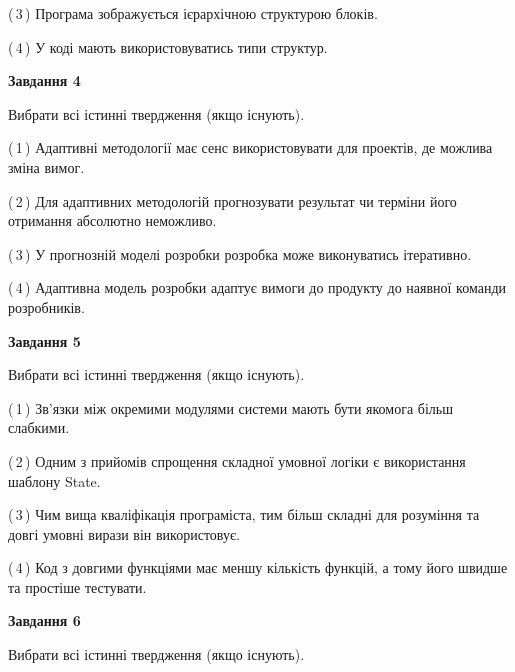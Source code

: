 \documentclass[10pt, ukrainian]{article}
\begin{document}
{\begin {large}
(\,3\,) Програма зображується ієрархічною структурою блоків.%



(\,4\,) У коді мають використовуватись типи структур. %


{\begin {center}\textbf{Завдання 4}\end {center}}\par
Вибрати всі істинні твердження (якщо існують).\par
\vspace{2mm}



(\,1\,) Адаптивні методології має сенс використовувати для проектів, де можлива зміна вимог. %



(\,2\,) Для адаптивних методологій прогнозувати результат чи терміни його отримання абсолютно неможливо. %



(\,3\,) У прогнозній моделі розробки розробка може виконуватись ітеративно. %



(\,4\,) Адаптивна модель розробки адаптує вимоги до продукту до наявної команди розробників. %


{\begin {center}\textbf{Завдання 5}\end {center}}\par
Вибрати всі істинні твердження (якщо існують).\par
\vspace{2mm}



(\,1\,) Зв'язки між окремими модулями системи мають бути якомога більш слабкими. %



(\,2\,) Одним з прийомів спрощення складної умовної логіки є використання шаблону State. %



(\,3\,) Чим вища кваліфікація програміста, тим більш складні для розуміння та довгі умовні вирази він використовує. %



(\,4\,) Код з довгими функціями має меншу кількість функцій, а тому його швидше та простіше тестувати. %

\newpage

{\begin {center}\textbf{Завдання 6}\end {center}}\par
Вибрати всі істинні твердження (якщо існують).\par
\vspace{2mm}




\end{large}}
\end{document}
